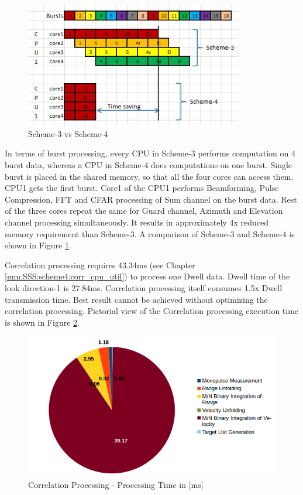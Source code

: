 \begin{figure}[h!]
	\centering
	\includegraphics[width=95mm]{figures/scheme5_time_saving}
	\caption{Scheme-3 vs Scheme-4}
	\label{fig:mm:scheme5_time_saving}
\end{figure}

In terms of burst processing, every CPU in Scheme-3 performs computation on 4 burst data, whereas a CPU in Scheme-4 does computations on one burst. Single burst is placed in the shared memory, so that all the four cores can access them. CPU1 gets the first burst. Core1 of the CPU1 performs Beamforming, Pulse Compression, FFT and CFAR processing of Sum channel on the burst data. Rest of the three cores repeat the same for Guard channel, Azimuth and Elevation channel processing simultaneously. It results in approximately 4x reduced memory requirement than Scheme-3. A comparison of Scheme-3 and Scheme-4 is shown in Figure \ref{fig:mm:scheme5_time_saving}.
\FloatBarrier

Correlation processing requires 43.34ms (see Chapter \ref{mm:SSS:scheme4:corr_cpu_util}) to process one Dwell data. Dwell time of the look direction-1 is 27.84ms. Correlation processing itself consumes 1.5x Dwell transmission time. Best result cannot be achieved without optimizing the correlation processing. Pictorial view of the Correlation processing execution time is shown in Figure \ref{fig:mm:corr_proc_pie}.

\begin{figure}[h!]
	\centering
	\includegraphics[width=120mm]{figures/corr_proc_pie}
	\caption{Correlation Processing - Processing Time in [ms]}
	\label{fig:mm:corr_proc_pie}
\end{figure}


